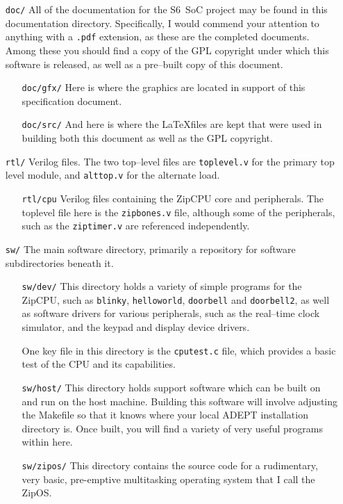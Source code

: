 \documentclass{gqtekspec}
\begin{document}
\begin{itemize}
\item[{\tt doc/}] All of the documentation for the S6~SoC project may be
	found in this documentation directory.  Specifically, I would commend
	your attention to anything with a {\tt .pdf} extension, as these
	are the completed documents.  Among these you should find a copy of the
	GPL copyright under which this software is released, as well as a
	pre--built copy of this document.
  \begin{itemize}
	\item[{\tt doc/gfx/}] Here is where the graphics are located in
		support of this specification document.
	\item[{\tt doc/src/}] And here is where the \LaTeX files are
		kept that were used in building both this document as well as
		the GPL copyright.
  \end{itemize}
\item[{\tt rtl/}] Verilog files.  The two top--level files are
	{\tt toplevel.v} for the primary top level module, and {\tt alttop.v}
	for the alternate load.
  \begin{itemize}
	\item[{\tt rtl/cpu}] Verilog files containing the ZipCPU core and
		peripherals.  The toplevel file here is the {\tt zipbones.v}
		file, although some of the peripherals, such as the
		{\tt ziptimer.v} are referenced independently.
  \end{itemize}
\item[{\tt sw/}] The main software directory, primarily a repository
	for software subdirectories beneath it.
  \begin{itemize}
	\item[{\tt sw/dev/}]  This directory holds a variety of
		simple programs for the ZipCPU, such as {\tt blinky},
		{\tt helloworld}, {\tt doorbell} and {\tt doorbell2}, as well
		as software drivers for various peripherals, such as the
		real--time clock simulator, and the keypad and display device
		drivers.

		One key file in this directory is the {\tt cputest.c} file,
		which provides a basic test of the CPU and its capabilities.

	\item[{\tt sw/host/}]  This directory holds support software which
		can be built on and run on the host machine.  Building this
		software will involve adjusting the Makefile so that it knows
		where your local ADEPT installation directory is.  Once built,
		you will find a variety of very useful programs within here.
	\item[{\tt sw/zipos/}]  This directory contains the source code for
		a rudimentary, very basic, pre-emptive multitasking operating
		system that I call the ZipOS.
  \end{itemize}
\end{itemize}
\end{document}

